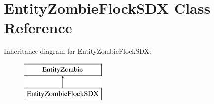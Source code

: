 \hypertarget{class_entity_zombie_flock_s_d_x}{}\section{Entity\+Zombie\+Flock\+S\+DX Class Reference}
\label{class_entity_zombie_flock_s_d_x}
Inheritance diagram for Entity\+Zombie\+Flock\+S\+DX\+:\begin{figure}[H]
\begin{center}
\leavevmode
\includegraphics[height=2.000000cm]{class_entity_zombie_flock_s_d_x}
\end{center}
\end{figure}
